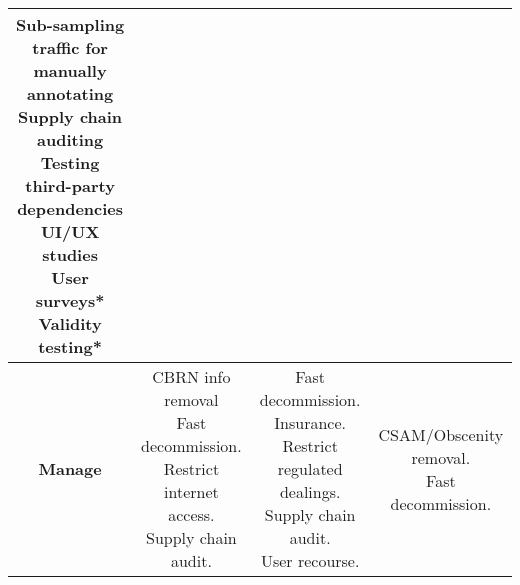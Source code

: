 \documentclass[fleqn]{article}
\begin{document}
\begin{table}[H]
\begin{tabular}{|c|c|c|c|}
{			\textbullet\hspace{3pt} Sub-sampling traffic for\\\hspace{10pt}manually annotating\\ 	
			\textbullet\hspace{3pt} Supply chain auditing\\ 	
			\textbullet\hspace{3pt} Testing third-party\\\hspace{10pt}dependencies\\ 	
			\textbullet\hspace{3pt} UI/UX studies\\ 	
			\textbullet\hspace{3pt} User surveys*\\ 	
			\textbullet\hspace{3pt} Validity testing*\\ 
		}   
		\\
		\hline
		\textbf{Manage} & 
		\makecell[l]{
			\textbullet\hspace{3pt} CBRN info removal\\ 
			\textbullet\hspace{3pt} Fast decommission. \\ 	
			\textbullet\hspace{3pt} Restrict internet access. \\ 	
			\textbullet\hspace{3pt} Supply chain audit. \\ 							 	 
		} 
		& \makecell[l]{
			\textbullet\hspace{3pt} Fast decommission. \\ 	
			\textbullet\hspace{3pt} Insurance. \\ 	
			\textbullet\hspace{3pt} Restrict regulated dealings. \\ 		
			\textbullet\hspace{3pt} Supply chain audit. \\ 	
			\textbullet\hspace{3pt} User recourse. \\  						 	 
		}
		& \makecell[l]{
			\textbullet\hspace{3pt} CSAM/Obscenity removal. \\ 	
			\textbullet\hspace{3pt} Fast decommission. \\ 	
}
\end{tabular}
\end{table}
\end{document}
